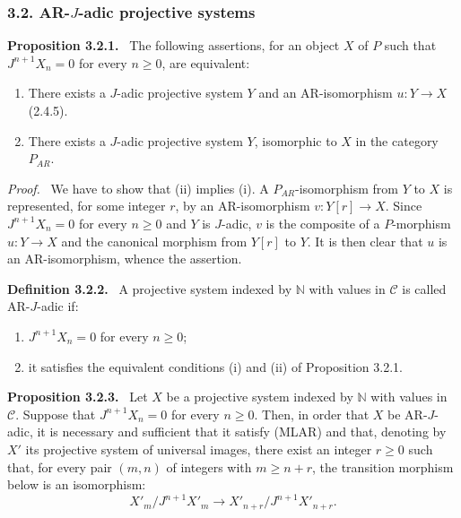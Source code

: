 \documentclass[11pt]{article}
\providecommand{\NN}{\mathbb{N}}
\newenvironment{statement}[1]{\par\medskip\noindent\textbf{#1.}\ }{\par\medskip}
\newenvironment{prooftext}[1][Proof]{\par\noindent\emph{#1.}\ }{\par\medskip}
\providecommand{\NN}{\mathbb N}
\providecommand{\cC}{\mathcal C}
\begin{document}
\subsubsection*{3.2. AR-$J$-adic projective systems}
\begin{statement}{Proposition 3.2.1}
The following assertions, for an object $X$ of $P$ such that $J^{n+1}X_n=0$ for every $n\ge0$, are equivalent:
\begin{enumerate}[label=(\roman*)]
\item There exists a $J$-adic projective system $Y$ and an AR-isomorphism $u:Y\to X$ (2.4.5).
\item There exists a $J$-adic projective system $Y$, isomorphic to $X$ in the category $P_{AR}$.
\end{enumerate}
\end{statement}

\begin{prooftext}[Proof]
We have to show that (ii) implies (i). A $P_{AR}$-isomorphism from $Y$ to $X$ is represented, for some integer $r$, by an AR-isomorphism $v:Y[r]\to X$. Since $J^{n+1}X_n=0$ for every $n\ge0$ and $Y$ is $J$-adic, $v$ is the composite of a $P$-morphism $u:Y\to X$ and the canonical morphism from $Y[r]$ to $Y$. It is then clear that $u$ is an AR-isomorphism, whence the assertion.
\end{prooftext}

\begin{statement}{Definition 3.2.2}
A projective system indexed by $\NN$ with values in $\cC$ is called AR-$J$-adic if:
\begin{enumerate}[label=(\alph*)]
\item $J^{n+1}X_n=0$ for every $n\ge0$;
\item it satisfies the equivalent conditions (i) and (ii) of Proposition 3.2.1.
\end{enumerate}
\end{statement}

\begin{statement}{Proposition 3.2.3}
Let $X$ be a projective system indexed by $\NN$ with values in $\cC$. Suppose that $J^{n+1}X_n=0$ for every $n\ge0$. Then, in order that $X$ be AR-$J$-adic, it is necessary and sufficient that it satisfy (MLAR) and that, denoting by $X'$ its projective system of universal images, there exist an integer $r\ge0$ such that, for every pair $(m,n)$ of integers with $m\ge n+r$, the transition morphism below is an isomorphism:
\[
X'_m/J^{n+1}X'_m\longrightarrow X'_{n+r}/J^{n+1}X'_{n+r}.
\]
\end{statement}
\end{document}
